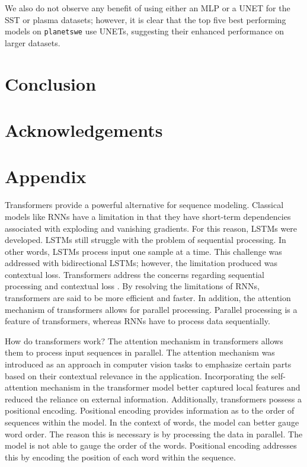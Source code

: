 \documentclass[11pt, a4paper]{article}
\begin{document}
We also do not observe any benefit of using either an MLP or a UNET for the SST or plasma datasets; however, it is clear that the top five best performing models on \texttt{planetswe} use UNETs, suggesting their enhanced performance on larger datasets.

\section{Conclusion}

\section{Acknowledgements}

\section{Appendix}

Transformers provide a powerful alternative for sequence modeling.
%
Classical models like RNNs have a limitation in that they have short-term \cite{article}
dependencies associated with exploding and vanishing gradients. For this reason, LSTMs were developed.
LSTMs still struggle with the problem of sequential processing. In other words, LSTMs process input one
sample at a time. This challenge was addressed with bidirectional LSTMs; however, the limitation produced
was contextual loss. Transformers address the concerns regarding sequential processing and contextual loss
\cite{islam2023comprehensivesurveyapplicationstransformers}. By resolving the limitations of RNNs, transformers are said to be more efficient and faster. In addition, the attention mechanism of transformers allows for parallel processing. Parallel processing is a feature
of transformers, whereas RNNs have to process data sequentially.

How do transformers work? The attention mechanism in transformers allows them to process input
sequences in parallel. The attention mechanism was introduced as an approach in computer vision tasks to emphasize certain parts based on their contextual relevance in the application. Incorporating the self-attention mechanism in the transformer model better captured local features and reduced the reliance on
external information. Additionally, transformers possess a positional encoding. Positional encoding provides information as to the order of sequences within the model. In the context of words, the model can
better gauge word order. The reason this is necessary is by processing the data in parallel. The model is not
able to gauge the order of the words. Positional encoding addresses this by encoding the position of each
word within the sequence.
\end{document}
